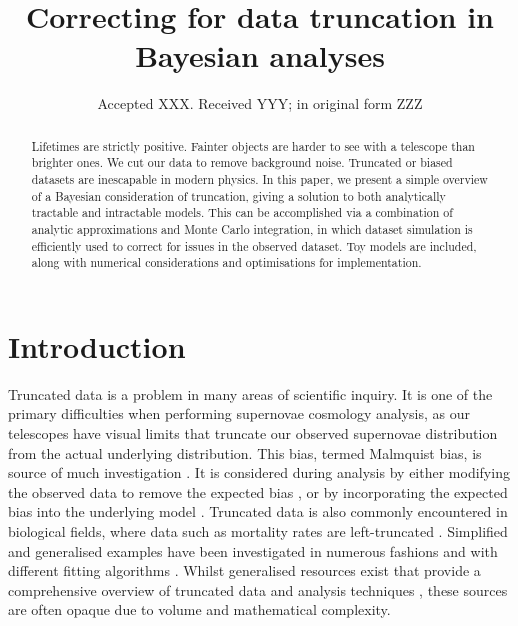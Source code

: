 \documentclass[a4paper,fleqn,usenatbib]{mnras}
\title[Correcting for data truncation in Bayesian analyses]{Correcting for data truncation in Bayesian analyses}
\author[S. R. Hinton et al.]{Samuel R. Hinton,$^{1,2}$\thanks{E-mail: \href{samuelreay@gmail.com}}
	Alex Kim,$^{3}$
	Tamara M. Davis,$^{1,2}$
\\
$^{1}$School of Mathematics and Physics, The University of Queensland, Brisbane, QLD 4072, Australia\\
$^{2}$ARC Centre of Excellence for All-sky Astrophysics (CAASTRO)\\
$^{3}$Lawrence Berkeley National Labs
}
\date{Accepted XXX. Received YYY; in original form ZZZ}
\begin{document}
\label{firstpage}
\pagerange{\pageref{firstpage}--\pageref{lastpage}}
\maketitle





\begin{abstract}
Lifetimes are strictly positive. Fainter objects are harder to see with a telescope than brighter ones. We cut our data to remove background noise.  Truncated or biased datasets are inescapable in modern physics. In this paper, we present a simple overview of a Bayesian consideration of truncation, giving a solution to both analytically tractable and intractable models. This can be accomplished via a combination of analytic approximations and Monte Carlo integration, in which dataset simulation is efficiently used to correct for issues in the observed dataset. Toy models are included, along with numerical considerations and optimisations for implementation.
\end{abstract}








\section{Introduction}

Truncated data is a problem in many areas of scientific inquiry. It is one of the primary difficulties when performing supernovae cosmology analysis, as our telescopes have visual limits that truncate our observed supernovae distribution from the actual underlying distribution. This bias, termed Malmquist bias, is source of much investigation \citep{Butkevich2005}. It is considered during analysis by either modifying the observed data to remove the expected bias \citep{BetouleKessler2014, ConleyGuySullivan2011}, or by incorporating the expected bias into the underlying model \citep{Rubin2015}. Truncated data is also commonly encountered in biological fields, where data such as mortality rates are left-truncated \citep{JANE1898}. Simplified and generalised examples have been investigated in numerous fashions \citep{woodroofe1985estimating, Gull1989bayesian, grogger1991models, o1995truncated} and with different fitting algorithms \citep{Gelfand1992}. Whilst generalised resources exist that provide a comprehensive overview of truncated data and analysis techniques \citep{klein2005survival}, these sources are often opaque due to volume and mathematical complexity. 
\end{document}

